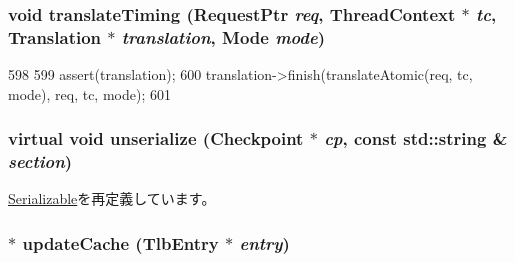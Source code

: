 \hypertarget{classAlphaISA_1_1TLB_ae52f7e465748883695d2b4f432a13652}{
\subsubsection[{translateTiming}]{\setlength{\rightskip}{0pt plus 5cm}void translateTiming ({\bf RequestPtr} {\em req}, \/  {\bf ThreadContext} $\ast$ {\em tc}, \/  {\bf Translation} $\ast$ {\em translation}, \/  {\bf Mode} {\em mode})}}
\label{classAlphaISA_1_1TLB_ae52f7e465748883695d2b4f432a13652}



\begin{DoxyCode}
598 {
599     assert(translation);
600     translation->finish(translateAtomic(req, tc, mode), req, tc, mode);
601 }
\end{DoxyCode}
\hypertarget{classAlphaISA_1_1TLB_af100c4e9feabf3cd918619c88c718387}{
\subsubsection[{unserialize}]{\setlength{\rightskip}{0pt plus 5cm}virtual void unserialize ({\bf Checkpoint} $\ast$ {\em cp}, \/  const std::string \& {\em section})}}
\label{classAlphaISA_1_1TLB_af100c4e9feabf3cd918619c88c718387}


\hyperlink{classSerializable_af100c4e9feabf3cd918619c88c718387}{Serializable}を再定義しています。\hypertarget{classAlphaISA_1_1TLB_a5d6ff82bfde528ed0663afc4a718a5a1}{
\subsubsection[{updateCache}]{$\ast$ updateCache ({\bf TlbEntry} $\ast$ {\em entry})}}
\label{classAlphaISA_1_1TLB_a5d6ff82bfde528ed0663afc4a718a5a1}



